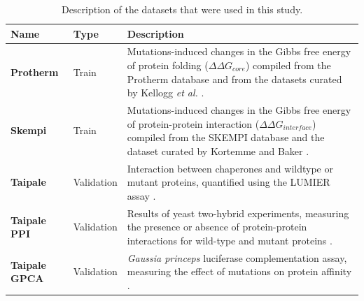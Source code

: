 
\begin{table}[tb]
	\caption[Datasets used for training, validating and testing core and interface predictors.]{Description of the datasets that were used in this study.}
	\label{tab:datasets}
	\begin{tabular}{ l |  p{1.8cm} | p{9.4cm} }
		\toprule
		Name                  & Type               & Description                                                                                                                                                                                                                                                                                                                  \\
		\midrule
		\textbf{Protherm}     & Train              & Mutations-induced changes in the Gibbs free energy of protein folding ($\Delta \Delta G_{core}$) compiled from the Protherm database \cite{bava_protherm_2004,kumar_protherm_2006} and from the datasets curated by Kellogg \textit{et al.} \cite{kellogg_role_2011}.                                                        \\
		\textbf{Skempi}       & Train              & Mutations-induced changes in the Gibbs free energy of protein-protein interaction ($\Delta \Delta G_{interface}$) compiled from the SKEMPI database \cite{moal_skempi:_2012} and the dataset curated by Kortemme and Baker \cite{kortemme_simple_2002}.                                                                      \\
		\textbf{Taipale}      & Validation         & Interaction between chaperones and wildtype or mutant proteins, quantified using the LUMIER assay \cite{sahni_widespread_2015}.                                                                                                                                                                                              \\
		\textbf{Taipale PPI}  & Validation         & Results of yeast two-hybrid experiments, measuring the presence or absence of protein-protein interactions for wild-type and mutant proteins \cite{sahni_widespread_2015}.                                                                                                                                                   \\
		\textbf{Taipale GPCA} & Validation         & \textit{Gaussia princeps} luciferase complementation assay, measuring the effect of mutations on protein affinity \cite{sahni_widespread_2015}.                                                                                                                                                                      \\

\end{tabular}
\end{table}
